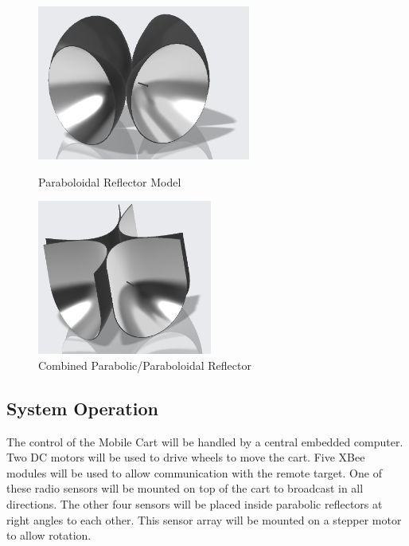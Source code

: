 \documentclass[letterpaper,12pt]{article}   %
\begin{document}
\begin{figure}[h!]
  \centering
  \begin{minipage}[t]{0.5\textwidth}
    \centering
    \includegraphics[height=2in]{figs/img/paraboloidalReflector}
    \captionsetup{width=\textwidth, justification=raggedright}
    \caption{Paraboloidal Reflector Model}
    \label{fig:parabolodialReflector}
  \end{minipage}
  \begin{minipage}[t]{0.4\textwidth}
    \centering
    \includegraphics[height=2in]{figs/img/parabolicReflector}
    \captionsetup{width=\textwidth, justification=raggedright}
    \caption{Combined Parabolic/Paraboloidal Reflector}
    \label{fig:parabolicReflector}
  \end{minipage}
\end{figure}

\subsection{System Operation}
 The control of the Mobile Cart will be handled by a central embedded
computer. Two DC motors will be used to drive
wheels to move the cart. Five XBee modules will be used to allow communication
with the remote target. One of these radio sensors will be mounted on top of the
cart to broadcast in all directions. The other four sensors will be placed
inside parabolic reflectors at right angles to each other. This sensor array
will be mounted on a stepper motor to allow rotation.
\end{document}
